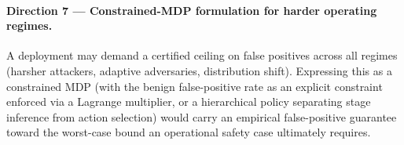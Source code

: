 \paragraph{Direction 7 --- Constrained-MDP formulation for harder operating regimes.} A deployment may demand a certified ceiling on false positives across all regimes (harsher attackers, adaptive adversaries, distribution shift). Expressing this as a constrained MDP (with the benign false-positive rate as an explicit constraint enforced via a Lagrange multiplier, or a hierarchical policy separating stage inference from action selection) would carry an empirical false-positive guarantee toward the worst-case bound an operational safety case ultimately requires.
